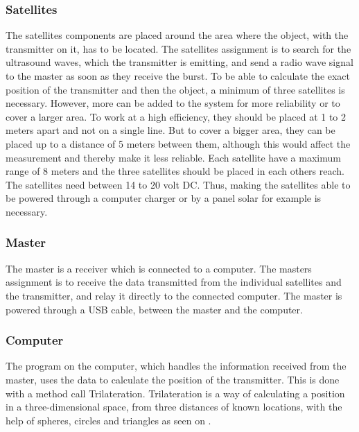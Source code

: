 \subsubsection{Satellites}
The satellites components are placed around the area where the object, with the transmitter on it, has to be located. The satellites assignment is to search for the ultrasound waves, which the transmitter is emitting, and send a radio wave signal to the master as soon as they receive the burst.
To be able to calculate the exact position of the transmitter and then the object, a minimum of three satellites is necessary. However, more can be added to the system for more reliability or to cover a larger area. To work at a high efficiency, they should be placed at 1 to 2 meters apart and not on a single line. But to cover a bigger area, they can be placed up to a distance of 5 meters between them, although this would affect the measurement and thereby make it less reliable. Each satellite have a maximum range of 8 meters and the three satellites should be placed in each others reach. The satellites need between 14 to 20 volt DC. Thus, making the satellites able to be powered through a computer charger or by a panel solar for example is necessary.

\subsubsection{Master}
The master is a receiver which is connected to a computer. The masters assignment is to receive the data transmitted from the individual satellites and the transmitter, and relay it directly to the connected computer. The master is powered through a USB cable, between the master and the computer.\\

\subsubsection{Computer}
The program on the computer, which handles the information received from the master, uses the data to calculate the position of the transmitter. This is done with a method call Trilateration. Trilateration is a way of calculating a position in a three-dimensional space, from three distances of known locations, with the help of spheres, circles and triangles as seen on .

